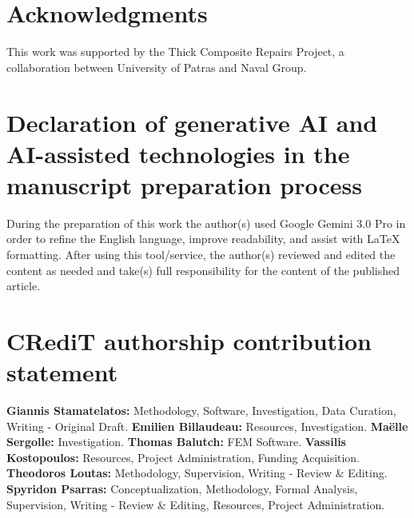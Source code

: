 \documentclass[
  preprint,
  12pt,
  a4paper
]{elsarticle}
\begin{document}
\section*{Acknowledgments}
This work was supported by the Thick Composite Repairs Project, a collaboration between University of Patras and Naval Group.

\section*{Declaration of generative AI and AI-assisted technologies in the manuscript preparation process}

During the preparation of this work the author(s) used Google Gemini 3.0 Pro in order to refine the English language, improve readability, and assist with LaTeX formatting. After using this tool/service, the author(s) reviewed and edited the content as needed and take(s) full responsibility for the content of the published article.

\section*{CRediT authorship contribution statement}
\textbf{Giannis Stamatelatos:} Methodology, Software, Investigation, Data Curation, Writing - Original Draft.
\textbf{Emilien Billaudeau:} Resources, Investigation.
\textbf{Maëlle Sergolle:} Investigation.
\textbf{Thomas Balutch:} FEM Software.
\textbf{Vassilis Kostopoulos:} Resources, Project Administration, Funding Acquisition.
\textbf{Theodoros Loutas:} Methodology, Supervision, Writing - Review \& Editing.
\textbf{Spyridon Psarras:} Conceptualization, Methodology, Formal Analysis, Supervision, Writing - Review \& Editing, Resources, Project Administration.


\end{document}

